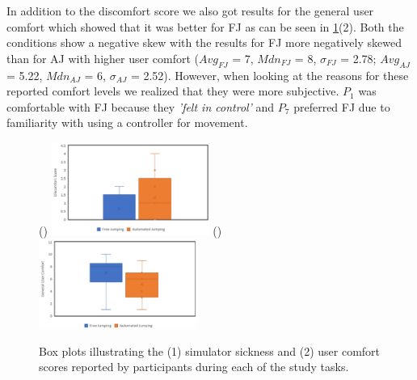 In addition to the discomfort score we also got results for the general user comfort which showed that it was better for FJ as can be seen in \cref{fig:user-comfort}(2). Both the conditions show a negative skew with the results for FJ more negatively skewed than for AJ with higher user comfort ($Avg_{FJ}$ = 7, $Mdn_{FJ}$ = 8, $\sigma_{FJ}$ = 2.78; $Avg_{AJ}$ = 5.22, $Mdn_{AJ}$ = 6, $\sigma_{AJ}$ = 2.52). However, when looking at the reasons for these reported comfort levels we realized that they were more subjective. $P_1$ was comfortable with FJ because they \textit{'felt in control'} and $P_7$ preferred FJ due to familiarity with using a controller for movement. 
\begin{figure}[]
	()
	\includegraphics[width=0.46\textwidth]{images/simulator-sickness.pdf}
	()
	\includegraphics[width=0.46\textwidth]{images/user-comfort.pdf}
	\caption{Box plots illustrating the (1) simulator sickness and (2) user comfort scores reported by participants during each of the study tasks.}
	\label{fig:user-comfort}
\end{figure}

